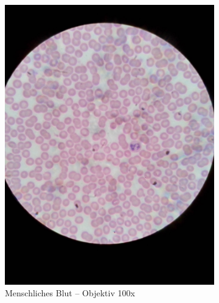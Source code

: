 \begin{figure}[h!]
	\begin{subfigure}[b]{0.45\textwidth}
		\includegraphics[angle=270, width=1\textwidth]{../images/01_human_blood.jpg}
		\caption{Menschliches Blut -- Objektiv 100x}
		\label{fig:01_human_blood}
	\end{subfigure}
	\begin{subfigure}[b]{0.45\textwidth}

\end{subfigure}
\end{figure}
